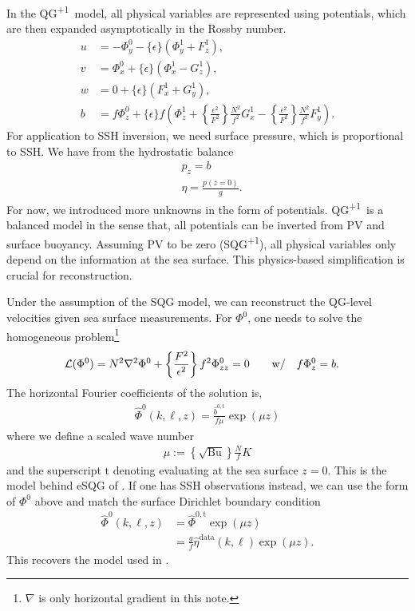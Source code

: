 \documentclass[11pt,letterpaper]{article}
\newcommand{\pl}{\textsuperscript{+1}}
\newcommand{\Ro}{\{\epsilon\}}
\newcommand{\Ub}{\left\{\frac{F^2}{\epsilon^2}\right\}}
\newcommand{\Bu}{\left\{\frac{\epsilon^2}{F^2}\right\}}
\begin{document}
In the QG\pl~model, all physical variables are represented using potentials, which are then expanded asymptotically in the Rossby number. 
\begin{subequations}\label{eq:var_expan}
\begin{align}
    u &= -\Phi^0_y-\Ro(\Phi^1_y+F^1_z),\\
    v &= \Phi^0_x+\Ro(\Phi^1_x-G^1_z),\\
    w &= 0+\Ro(F_x^1+G_y^1),\label{eq:w_expan}\\
    b &= f\Phi^0_z+\Ro f\left(\Phi^1_z+\Bu \frac{N^2}{f^2} G^1_x- \Bu \frac{N^2}{f^2} F^1_y\right).
\end{align}
\end{subequations}
For application to SSH inversion, we need surface pressure, which is proportional to SSH. We have from the hydrostatic balance
\begin{align}
    &p_z = b\\
    &\eta = \frac{p(z=0)}{g}.
\end{align}
For now, we introduced more unknowns in the form of potentials. QG\pl~is a balanced model in the sense that, all potentials can be inverted from PV and surface buoyancy. Assuming PV to be zero (SQG\pl), all physical variables only depend on the information at the sea surface. This physics-based simplification is crucial for reconstruction. 

Under the assumption of the SQG model, we can reconstruct the QG-level velocities given sea surface measurements. For $\Phi^0$, one needs to solve the homogeneous problem\footnote{$\nabla$ is only horizontal gradient in this note.}
\begin{align}
    \mathcal{L}(\Phi^0) = N^2\nabla^2 \Phi^0+\Ub f^2\Phi^0_{zz} = 0
    &\quad \qdt{w/} f\Phi^0_z = b.
\end{align}
The horizontal Fourier coefficients of the solution is,
\begin{align}
    \hat\Phi^0(k,\ell,z) =  \frac{\hat b^{0,\mathrm{t}}}{f\mu}\exp\left(\mu z\right)\label{eq:SQG_fromb}
\end{align}
where we define a scaled wave number
\begin{align}\label{eq:SQG_scalewavenum}
    \mu := \left\{\sqrt{\text{Bu}}\right\}\frac{N}{f}K
\end{align}
and the superscript $\text{t}$ denoting evaluating at the sea surface $z=0$.
This is the model behind eSQG of \cite{LapeyreKlein_06}. If one has SSH observations instead, we can use the form of $\Phi^0$ above and match the surface Dirichlet boundary condition
\begin{align}
    \hat\Phi^0(k,\ell,z) &= \hat\Phi^{0,\text{t}}\exp\left(\mu z\right)\\
    &= \frac{g}{f}\hat\eta^\text{data}(k,\ell)\exp\left(\mu z\right).
\end{align}
This recovers the model used in \cite{KleinEtAl_09}. 
\end{document}
